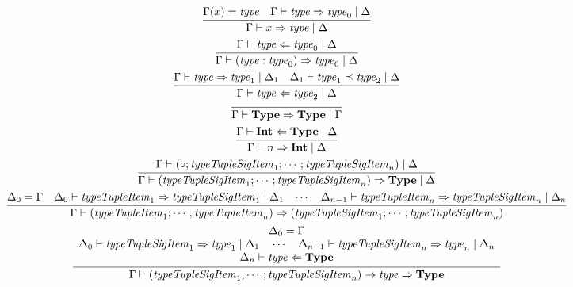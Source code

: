 \begin{gather*}
  \infer{\Gamma \vdash x \Rightarrow \mathit{type} \mid \Delta}{
    \Gamma(x) = \mathit{type}
    &
    \Gamma \vdash \mathit{type} \Rightarrow \mathit{type}_0 \mid \Delta
  }
  \\
  \infer{\Gamma \vdash (\mathit{type}: \mathit{type}_0) \Rightarrow \mathit{type}_0 \mid \Delta}{
    \Gamma \vdash \mathit{type} \Leftarrow \mathit{type}_0 \mid \Delta
  }
  \\
  \infer{\Gamma \vdash \mathit{type} \Leftarrow \mathit{type}_2 \mid \Delta}{
    \Gamma \vdash \mathit{type} \Rightarrow \mathit{type}_1 \mid \Delta_1
    &
    \Delta_1 \vdash \mathit{type}_1 \preceq \mathit{type}_2 \mid \Delta
  }
  \\
  \infer{\Gamma \vdash \mathbf{Type} \Rightarrow \mathbf{Type} \mid \Gamma}{}
  \\
  \infer{\Gamma \vdash n \Rightarrow \mathbf{Int} \mid \Delta}{
    \Gamma \vdash \mathbf{Int} \Leftarrow \mathbf{Type} \mid \Delta
  }
  \\
  \infer{\Gamma \vdash (\mathit{typeTupleSigItem}_1; \cdots; \mathit{typeTupleSigItem}_n) \Rightarrow \mathbf{Type} \mid \Delta}{
    \Gamma \vdash (\circ; \mathit{typeTupleSigItem}_1; \cdots; \mathit{typeTupleSigItem}_n) \mid \Delta
  }
  \\
  \infer{\Gamma \vdash (\mathit{typeTupleItem}_1; \cdots; \mathit{typeTupleItem}_n) \Rightarrow (\mathit{typeTupleSigItem}_1; \cdots; \mathit{typeTupleSigItem}_n)}{
    \Delta_0 = \Gamma
    &
    \Delta_0 \vdash \mathit{typeTupleItem}_1 \Rightarrow \mathit{typeTupleSigItem}_1 \mid \Delta_1
    &
    \cdots
    &
    \Delta_{n - 1} \vdash \mathit{typeTupleItem}_n \Rightarrow \mathit{typeTupleSigItem}_n \mid \Delta_n
  }
  \\
  \infer{\Gamma \vdash (\mathit{typeTupleSigItem}_1; \cdots; \mathit{typeTupleSigItem}_n) \rightarrow \mathit{type} \Rightarrow \mathbf{Type}}{
    \begin{array}{c}
      \Delta_0 = \Gamma
      \\
      \Delta_0 \vdash \mathit{typeTupleSigItem}_1 \Rightarrow \mathit{type}_1 \mid \Delta_1
      \hspace{1em}
      \cdots
      \hspace{1em}
      \Delta_{n - 1} \vdash \mathit{typeTupleSigItem}_n \Rightarrow \mathit{type}_n \mid \Delta_n
      \\
      \Delta_n \vdash \mathit{type} \Leftarrow \mathbf{Type}
    \end{array}
  }

\end{gather*}
